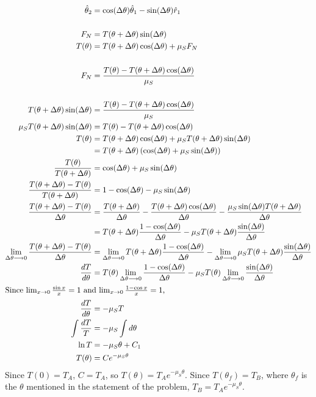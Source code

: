 \documentclass[solutions]{esg8012pset}
\begin{document}
  \begin{align*}
    \hat\theta_2 & = \cos(\Delta\theta)\hat\theta_1 - \sin(\Delta\theta)\hat r_1 \\
    \\
    F_N & = T(\theta + \Delta\theta)\sin(\Delta\theta) \\
    T(\theta) & = T(\theta + \Delta\theta)\cos(\Delta\theta) + \mu_S F_N \\
    \\
    F_N & = \frac{T(\theta) - T(\theta + \Delta\theta)\cos(\Delta\theta)}{\mu_S} \\
    \\
    T(\theta + \Delta\theta)\sin(\Delta\theta) & = \frac{T(\theta) - T(\theta + \Delta\theta)\cos(\Delta\theta)}{\mu_S} \\
    \mu_S T(\theta + \Delta\theta)\sin(\Delta\theta) & = T(\theta) - T(\theta + \Delta\theta)\cos(\Delta\theta) \\
    T(\theta) & = T(\theta + \Delta\theta)\cos(\Delta\theta) + \mu_S T(\theta + \Delta\theta)\sin(\Delta\theta) \\
     & = T(\theta + \Delta\theta)\left(\cos(\Delta\theta) + \mu_S \sin(\Delta\theta)\right) \\
    \frac{T(\theta)}{T(\theta + \Delta\theta)} & = \cos(\Delta\theta) + \mu_S \sin(\Delta\theta) \\
    \frac{T(\theta + \Delta\theta) - T(\theta)}{T(\theta + \Delta\theta)} & = 1 - \cos(\Delta\theta) - \mu_S \sin(\Delta\theta) \\
    \frac{T(\theta + \Delta\theta) - T(\theta)}{\Delta\theta} & = \frac{T(\theta + \Delta\theta)}{\Delta\theta} - \frac{T(\theta + \Delta\theta)\cos(\Delta\theta)}{\Delta\theta} - \frac{\mu_S \sin(\Delta\theta)T(\theta + \Delta\theta)}{\Delta\theta} \\
    & = T(\theta + \Delta\theta)\frac{1 -\cos(\Delta\theta)}{\Delta\theta} - \mu_S T(\theta + \Delta\theta)\frac{\sin(\Delta\theta)}{\Delta\theta} \\
    \lim_{\Delta\theta \longrightarrow 0} \frac{T(\theta + \Delta\theta) - T(\theta)}{\Delta\theta} & = \lim_{\Delta\theta \longrightarrow 0} T(\theta + \Delta\theta)\frac{1 -\cos(\Delta\theta)}{\Delta\theta} - \lim_{\Delta\theta \longrightarrow 0} \mu_S T(\theta + \Delta\theta)\frac{\sin(\Delta\theta)}{\Delta\theta} \\
    \frac{d T}{d\theta} & = T(\theta)\lim_{\Delta\theta \longrightarrow 0} \frac{1 -\cos(\Delta\theta)}{\Delta\theta} - \mu_S T(\theta)\lim_{\Delta\theta \longrightarrow 0} \frac{\sin(\Delta\theta)}{\Delta\theta} \\
  \intertext{Since $\lim_{x\rightarrow 0}\frac{\sin x}{x} = 1$ and $\lim_{x\rightarrow 0}\frac{1-\cos x}{x} = 1$,}
    \frac{d T}{d\theta} & = -\mu_S T \\
    \int \frac{d T}{T} & = -\mu_S\int d \theta \\
    \ln T & = -\mu_S \theta + C_1 \\
    T(\theta) & = Ce^{-\mu_S\theta}
  \end{align*}
  Since $T(0) = T_A$, $C = T_A$, so $T(\theta) = T_A e^{-\mu_S \theta}$.  Since $T(\theta_f) = T_B$, where $\theta_f$ is the $\theta$ mentioned in the statement of the problem, $T_B = T_A e^{-\mu_S \theta}$.
\end{document}
